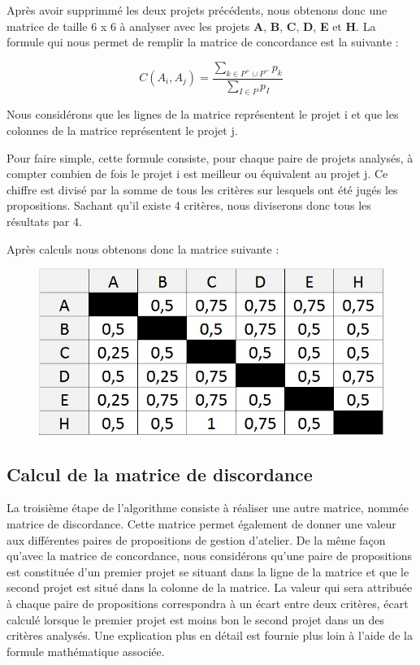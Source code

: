\documentclass[a4paper,10pt]{article}
\begin{document}
Après avoir supprimmé les deux projets précédents, nous obtenons donc une matrice de taille 6 x 6 à analyser avec les projets \textbf{A}, \textbf{B}, \textbf{C}, \textbf{D}, \textbf{E} et \textbf{H}. La formule qui nous permet de remplir la matrice de concordance est la suivante :

\[
  C(A_i, A_j) = \frac{\sum\limits_{k \in P^+ \cup P^=}{p_k}}{\sum\limits_{I \in P}{p_I}}
\]

Nous considérons que les lignes de la matrice représentent le projet i et que les colonnes de la matrice représentent le projet j.

Pour faire simple, cette formule consiste, pour chaque paire de projets analysés, à compter combien de fois le projet i est meilleur ou équivalent au projet j. Ce chiffre est divisé par la somme de tous les critères sur lesquels ont été jugés les propositions. Sachant qu'il existe 4 critères, nous diviserons donc tous les résultats par 4.


Après calculs nous obtenons donc la matrice suivante :

\begin{figure}[h]
\begin{center}
\includegraphics[scale=0.3]{img/AD_Concordance_neutre.jpg}
\end{center}
\end{figure}

\subsection{Calcul de la matrice de discordance}

La troisième étape de l'algorithme consiste à réaliser une autre matrice, nommée matrice de discordance. Cette matrice permet également de donner une valeur aux différentes paires de propositions de gestion d'atelier. De la même façon qu'avec la matrice de concordance, nous considérons qu'une paire de propositions est constituée d'un premier projet se situant dans la ligne de la matrice et que le second projet est situé dans la colonne de la matrice. La valeur qui sera attribuée à chaque paire de propositions correspondra à un écart entre deux critères, écart calculé lorsque le premier projet est moins bon le second projet dans un des critères analysés. Une explication plus en détail est fournie plus loin à l'aide de la formule mathématique associée.
\end{document}
